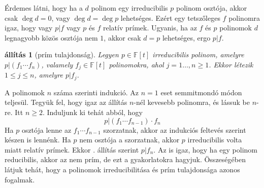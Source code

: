 \documentclass[a4paper, showtrims]{memoir}
\makeatletter
\renewenvironment{proof}[1][\proofname]
    {\par\pushQED{\qed}%
    \normalfont \topsep6\p@\@plus6\p@\relax
    \trivlist
    \item[\hskip\labelsep
        \itshape
    #1\@addpunct{:}]\ignorespaces}
    {\popQED\endtrivlist\@endpefalse}
\theoremstyle{plain}
\newtheorem{proposition}{állítás}[chapter]
\theoremstyle{remark}
\theoremstyle{definition}
\makeatother
\begin{document}
Érdemes látni,
hogy ha a $d$ polinom egy irreducibilis $p$ polinom osztója,
akkor csak
$\deg d=0$, vagy $\deg d=\deg p$ lehetséges.
Ezért egy tetszőleges $f$ polinomra igaz, hogy
vagy $p|f$ vagy $p$ és $f$ relatív prímek.
Ugyanis,
ha az $f$ és $p$ polinomok $d$ legnagyobb közös osztója nem $1$,
akkor csak $d=p$ lehetséges, ergo $p|f$.
\begin{proposition}[prím tulajdonság]
	Legyen $p\in\mathbb{F}\left[ t \right]$ irreducibilis polinom, amelyre
	$p|(f_1\cdots f_n)$, valamely $f_j\in\mathbb{F}\left[ t \right]$ polinomokra, ahol $j=1\dots,n\geq 1$.
	Ekkor létezik $1\leq j\leq n$, amelyre $p|f_j$.\qedhere
\end{proposition}
\begin{proof}
	A polinomok $n$ száma szerinti indukció.
	Az $n=1$ eset semmitmondó módon teljesül.
	Tegyük fel, hogy igaz az állítás $n$-nél kevesebb polinomra,
	és lássuk be $n$-re. Itt $n\geq 2$.
	Induljunk ki tehát abból, hogy
	\[
		p|\left( f_1\cdots f_{n-1} \right)\cdot f_n
	\]
	Ha $p$ osztója lenne az $f_1\cdots f_{n-1}$ szorzatnak,
	akkor az indukciós feltevés szerint készen is lennénk.
	Ha $p$ nem osztója a szorzatnak,
	akkor $p$ irreducibilis volta miatt relatív prímek.
    Ekkor . állítás  szerint $p|f_n$.
\end{proof}
Az is igaz, hogy ha egy polinom reducibilis, akkor az nem prím, de ezt a gyakorlatokra hagyjuk.
Összeségében látjuk tehát,
hogy a polinomok irreducibilitása és prím tulajdonsága azonos fogalmak.
\end{document}
